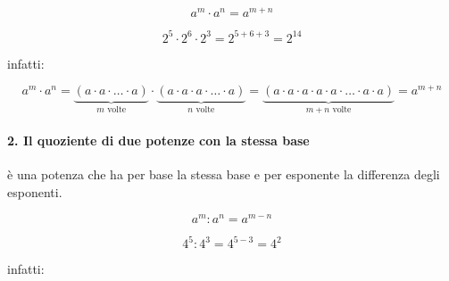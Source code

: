 \begin{minipage}[c]{.35\textwidth}
\vspace{4.5mm}
 \[\boxed{a^m \cdot a^n = a^{m+n}}\]
\end{minipage}
\hfil
\begin{minipage}[c]{.35\textwidth}
\[ 2^5 \cdot 2^6 \cdot 2^3 = 2^{5+6+3}=2^{14}\]
\end{minipage}
\hfil
\begin{minipage}[c]{.25\textwidth}
\vspace{4.5mm}
\centering infatti:
\end{minipage}
\[ a^m \cdot a^n = \underbrace{(a\cdot a\cdot\ldots\cdot a)}_{m\text{ 
volte}}\cdot%
 \underbrace{(a\cdot a\cdot a\cdot\ldots\cdot a)}_{n\text{ volte}}
 =\underbrace{(a\cdot a\cdot a\cdot a\cdot a\cdot\ldots\cdot a\cdot 
a)}_{m+n\text{ volte}}%
 =a^{m+n}\]
\vspace{-1em}
\paragraph{2. Il quoziente di due potenze con la stessa base} 
è una potenza che ha per base la stessa base e per esponente la differenza 
degli esponenti.

\begin{minipage}[h]{.35\textwidth}
\vspace{4.5mm}
\[\boxed{a^m : a^n = a^{m-n}}\]
\end{minipage}\hfil
\begin{minipage}[h]{.35\textwidth}
\[4^5 : 4^3 = 4^{5 - 3} = 4^2\]
\end{minipage}
\hfil
\begin{minipage}[c]{.25\textwidth}
\vspace{4.5mm}
\centering infatti:
\end{minipage}
% 
%

